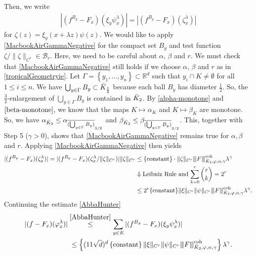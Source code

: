 Then, we write 
\begin{align*}
    | (f^{B_y} - F_x)(\xi_y \psi^\lambda_x) | = | (f^{B_y} - F_x)(\zeta_x^\lambda) |
\end{align*}  
for $\zeta(z) = \xi_y(x + \lambda z) \psi(z)$. We would like to apply \eqref{MacbookAirGammaNegative} for the compact set $B_y$ and test function $\zeta / \lVert \zeta \rVert_{C^r} \in \mathcal{B}_r$. Here, we need to be careful about $\alpha$, $\beta$ and $r$. We must check that \eqref{MacbookAirGammaNegative} still holds if we choose $\alpha$, $\beta$ and $r$ as in \eqref{tropicalGeometryie}. Let $\Gamma = \left\{ y_1,...,y_n \right\} \subset \mathbb{R}^d$ such that $y_i \cap K \not = \emptyset$ for all $1 \leq i \leq n$. We have $\bigcup_{y \in \Gamma}B_y \subset \bar{K}_{\frac{1}{2}}$ because each ball $B_y$ has diameter $\frac{1}{2}$. So, the $\frac{3}{2}$-enlargement of $\bigcup_{y \in \Gamma}B_y$ is contained in $\bar{K}_{2}$. By \eqref{alpha-monotone} and $\eqref{beta-monotone}$, we know that the maps $K \mapsto \alpha_K$ and $K \mapsto \beta_K$ are monotone. So, we have $\alpha_{\bar{K}_{2}} \leq \alpha_{\overline{(\bigcup_{y \in \Gamma}B_y)}_{3/2}}$ and $\beta_{\bar{K}_{2}} \leq \beta_{\overline{(\bigcup_{y \in \Gamma}B_y)}_{3/2}}$. This, together with Step 5 ($\gamma > 0$), shows that \eqref{MacbookAirGammaNegative} remains true for $\alpha, \beta$ and $r$. Applying \eqref{MacbookAirGammaNegative} then yields
\begin{align*}
    | (f^{B_y} - F_x)(\zeta_x^\lambda) | = | (f^{B_y} - F_x)(\zeta_x^\lambda / \lVert \zeta \rVert_{C^r}) | \lVert \zeta \rVert_{C^r} &\leq \{ \mathrm{constant} \} \cdot \lVert \zeta \rVert_{C^r} {\left\vert\kern-0.25ex\left\vert\kern-0.25ex\left\vert F \right\vert\kern-0.25ex\right\vert\kern-0.25ex\right\vert}^{\mathrm{coh}}_{\bar{K}_{2}, \varphi, \alpha, \gamma} \lambda^\gamma \\
    &\Downarrow \text{Leibniz Rule and $\sum_{k=0}^r {r \choose k} = 2^r$ }\\
    &\leq  2^r \{ \mathrm{constant} \}\lVert \xi \rVert_{C^r} \lVert \psi \rVert_{C^r} {\left\vert\kern-0.25ex\left\vert\kern-0.25ex\left\vert F \right\vert\kern-0.25ex\right\vert\kern-0.25ex\right\vert}^{\mathrm{coh}}_{\bar{K}_{2}, \varphi, \alpha, \gamma} \lambda^\gamma.
\end{align*} 
Continuing the estimate \eqref{AbbaHunter} 
\begin{align*}
    |(f-F_x)(\varphi^\lambda_x)| &\overset{\eqref{AbbaHunter}}{\leq} \sum_{y \in E} | (f^{B_y} - F_x)(\xi_y \psi^\lambda_x) | \\ 
    &\;\leq \left\{ (11\sqrt{d})^d \left\{ \mathrm{constant} \right\} \lVert \xi \rVert_{C^r}\lVert \psi \rVert_{C^r}{\left\vert\kern-0.25ex\left\vert\kern-0.25ex\left\vert F \right\vert\kern-0.25ex\right\vert\kern-0.25ex\right\vert}^{\mathrm{coh}}_{\bar{K}_{2}, \varphi, \alpha, \gamma} \right\}\lambda^\gamma.
\end{align*}
